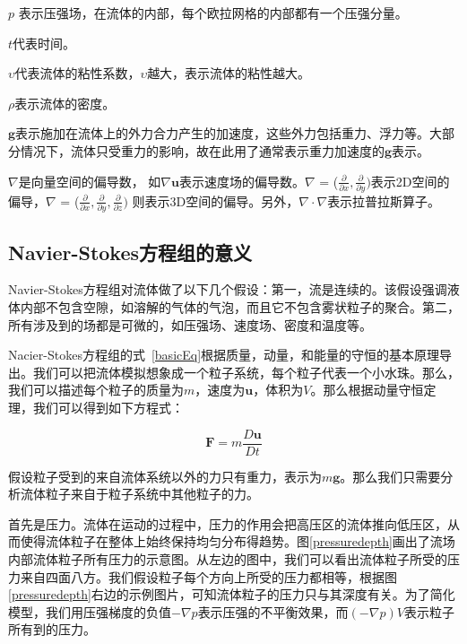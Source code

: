 \(p\) 表示压强场，在流体的内部，每个欧拉网格的内部都有一个压强分量。

\(t\)代表时间。
 
\(\upsilon\)代表流体的粘性系数，\(\upsilon\)越大，表示流体的粘性越大。
 
\(\rho\)表示流体的密度。
  
 \(\boldsymbol g\)表示施加在流体上的外力合力产生的加速度，这些外力包括重力、浮力等。大部分情况下，流体只受重力的影响，故在此用了通常表示重力加速度的\(\boldsymbol g\)表示。
 
 \(\nabla\)是向量空间的偏导数， 如\(\nabla {\boldsymbol u}\)表示速度场的偏导数。\(\nabla\) = (\(\frac{\partial}{\partial x}, \frac{\partial}{\partial y})\)表示2D空间的偏导，\(\nabla\) = (\(\frac{\partial}{\partial x}, \frac{\partial}{\partial y}, \frac{\partial}{\partial z})\) 则表示3D空间的偏导。另外，\(\nabla \cdot \nabla\)表示拉普拉斯算子。

\subsection{Navier-Stokes方程组的意义}
\label{sec:eqmeaning}
Navier-Stokes方程组对流体做了以下几个假设：第一，流是连续的。该假设强调液体内部不包含空隙，如溶解的气体的气泡，而且它不包含雾状粒子的聚合。第二，所有涉及到的场都是可微的，如压强场、速度场、密度和温度等。

Nacier-Stokes方程组的式~\ref{basicEq}根据质量，动量，和能量的守恒的基本原理导出。我们可以把流体模拟想象成一个粒子系统，每个粒子代表一个小水珠。那么，我们可以描述每个粒子的质量为\(m\)，速度为\(\boldsymbol u\)，体积为\(V\)。那么根据动量守恒定理，我们可以得到如下方程式：

\begin{equation}
\label{momentum}
 {\boldsymbol F} = m\frac{D{\boldsymbol u}}{D{t}}
\end{equation}

假设粒子受到的来自流体系统以外的力只有重力，表示为\(m{\boldsymbol g}\)。那么我们只需要分析流体粒子来自于粒子系统中其他粒子的力。

首先是压力。流体在运动的过程中，压力的作用会把高压区的流体推向低压区，从而使得流体粒子在整体上始终保持均匀分布得趋势。图\ref{pressuredepth}画出了流场内部流体粒子所有压力的示意图。从左边的图中，我们可以看出流体粒子所受的压力来自四面八方。我们假设粒子每个方向上所受的压力都相等，根据图\ref{pressuredepth}右边的示例图片，可知流体粒子的压力只与其深度有关。为了简化模型，我们用压强梯度的负值\(-\nabla p\)表示压强的不平衡效果，而\(({-\nabla p})V\)表示粒子所有到的压力。

